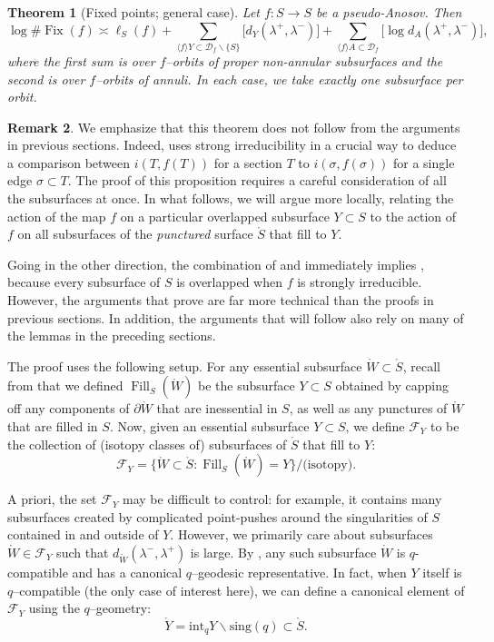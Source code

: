\documentclass[11pt,letterpaper]{amsart}
\newcommand{\sing}{\mathrm{sing}}
\newcommand{\Fill}{\operatorname{Fill}}
\newcommand{\mc}{\mathcal}
\newcommand{\mr}{\mathring}
\newcommand{\bdy}{\partial} %
\newcommand{\psub}{\mr W}
\newcommand{\Fix}{\operatorname{Fix}}
\numberwithin{equation}{section}
\newtheorem{theorem}{Theorem}[section]
\theoremstyle{definition}
\newtheorem{remark}[theorem]{Remark}
\renewcommand{\setminus}{\smallsetminus}
\renewcommand{\int}{\mathrm{int}}
\begin{document}
 
\begin{theorem}[Fixed points; general case] \label{thm:NSI}
Let $f \colon S \to S$ be a pseudo-Anosov. Then 
\[
\log \# \Fix(f) \asymp  \ell_{S}(f) + \sum_{\langle f \rangle Y \subset \mc D_f \setminus \{ S \}} \big[ d_Y(\lambda^+,\lambda^-) \big] + \sum_{\langle f \rangle A \subset \mc D_f} \big[ \log d_A(\lambda^+,\lambda^-) \big],
\]
where the first sum is over $f$--orbits of proper non-annular subsurfaces and the second is over $f$--orbits of annuli. In each case, we take exactly one subsurface per orbit. 
\end{theorem}

\begin{remark}
We emphasize that this theorem does not follow from the arguments in previous sections. Indeed, 
 uses strong irreducibility in a crucial way to 
 deduce a comparison between $i(T, f(T))$ for a section $T$ to   $i(\sigma, f(\sigma))$ for a single edge $\sigma \subset T$. The proof of this proposition requires a careful consideration of all the subsurfaces at once. In what follows, we will argue more locally, relating the action of the map $f$ on a particular overlapped subsurface $Y \subset S$ to the action of $f$ on all subsurfaces of the \emph{punctured} surface $\mr S$ that fill to $Y$. 

Going in the other direction, the combination of  and  immediately implies  , because every subsurface of $S$ is overlapped when $f$ is strongly irreducible.
However, the arguments that prove   are far more technical than the proofs in previous sections.
In addition, the arguments that will follow also rely on many of the lemmas in the preceding sections.
\end{remark}


The proof uses the following setup. For any essential subsurface $\psub \subset \mr S$, recall from   that we defined $\Fill_S(\psub)$ be the subsurface $Y \subset S$ obtained by capping off any components of $\bdy \psub$ that are inessential in $S$, as well as any punctures of $\psub$ that are filled in $S$. Now, given an essential subsurface $Y \subset S$, we define $\mc F_Y$ to be the collection of (isotopy classes of) subsurfaces of $\mr S$ that fill to $Y$:
\[
 \mc F_Y = \{ \psub \subset \mr S : \Fill_S(\psub) = Y \} / \text{(isotopy)}.
\]

A priori, the set $\mc F_Y$ may be difficult to control: for example, it contains many subsurfaces created by complicated point-pushes around the singularities of $S$ contained in and outside of $Y$. 
However, we primarily care about subsurfaces $\psub \in \mc F_Y$ such that $d_{\psub}(\lambda^-, \lambda^+)$ is large. By , any such subsurface $\psub$ is $q$-compatible and has a canonical $q$--geodesic representative. 
In fact, when $Y$ itself is $q$--compatible (the only case of interest here), we can define a canonical element of $\mc F_Y$ using the $q$--geometry:
\[
\mr Y = \int_q Y \setminus \sing(q) \subset \mr S.
\]
\end{document}
